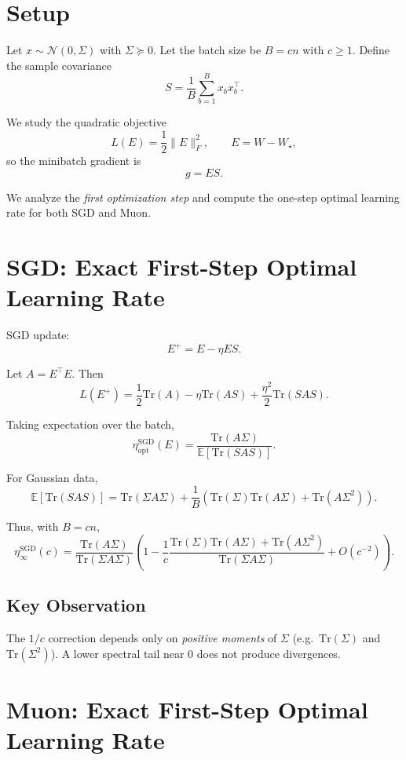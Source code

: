 \documentclass[11pt]{article}
\begin{document}
\section{Setup}

Let $x \sim \mathcal{N}(0,\Sigma)$ with $\Sigma \succeq 0$.
Let the batch size be $B = c n$ with $c \ge 1$.
Define the sample covariance
\[
S = \frac{1}{B} \sum_{b=1}^B x_b x_b^\top.
\]

We study the quadratic objective
\[
L(E) = \frac{1}{2}\|E\|_F^2,
\qquad E = W - W_\star,
\]
so the minibatch gradient is
\[
g = ES.
\]

We analyze the \emph{first optimization step} and compute the one-step optimal
learning rate for both SGD and Muon.

\section{SGD: Exact First-Step Optimal Learning Rate}

SGD update:
\[
E^+ = E - \eta ES.
\]

Let $A = E^\top E$. Then
\[
L(E^+) = \frac{1}{2} \mathrm{Tr}(A)
- \eta \mathrm{Tr}(AS)
+ \frac{\eta^2}{2} \mathrm{Tr}(SAS).
\]

Taking expectation over the batch,
\[
\eta_{\mathrm{opt}}^{\mathrm{SGD}}(E)
= \frac{\mathrm{Tr}(A\Sigma)}
{\mathbb{E}[\mathrm{Tr}(SAS)]}.
\]

For Gaussian data,
\[
\mathbb{E}[\mathrm{Tr}(SAS)]
=
\mathrm{Tr}(\Sigma A \Sigma)
+
\frac{1}{B}
\left(
\mathrm{Tr}(\Sigma)\mathrm{Tr}(A\Sigma)
+
\mathrm{Tr}(A\Sigma^2)
\right).
\]

Thus, with $B=cn$,
\[
\eta_\infty^{\mathrm{SGD}}(c)
=
\frac{\mathrm{Tr}(A\Sigma)}
{\mathrm{Tr}(\Sigma A \Sigma)}
\left(
1
-
\frac{1}{c}
\frac{
\mathrm{Tr}(\Sigma)\mathrm{Tr}(A\Sigma)
+
\mathrm{Tr}(A\Sigma^2)
}
{\mathrm{Tr}(\Sigma A \Sigma)}
+ O(c^{-2})
\right).
\]

\subsection*{Key Observation}

The $1/c$ correction depends only on \emph{positive moments}
of $\Sigma$ (e.g.\ $\mathrm{Tr}(\Sigma)$ and $\mathrm{Tr}(\Sigma^2)$).
A lower spectral tail near $0$ does not produce divergences.

\section{Muon: Exact First-Step Optimal Learning Rate}
\end{document}
